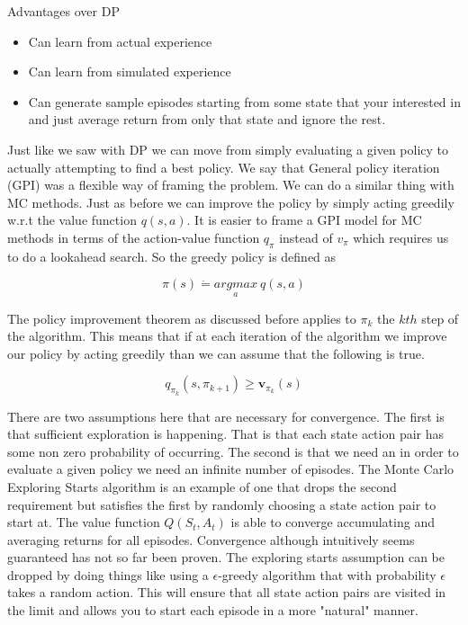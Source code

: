 Advantages over DP

\begin{itemize}
    \item Can learn from actual experience
    \item Can learn from simulated experience
    \item Can generate sample episodes starting from some state that your interested in and just average return from only that state and ignore the rest. 
\end{itemize}
 
Just like we saw with DP we can move from simply evaluating a given policy to actually attempting to find a best policy. We say that General policy iteration (GPI) was a flexible way of framing the problem. We can do a similar thing with MC methods. Just as before we can improve the policy by simply acting greedily w.r.t the value function $q(s,a)$. It is easier to frame a GPI model for MC methods in terms of the action-value function $q_{\pi}$ instead of $v_{\pi}$ which requires us to do a lookahead search.  So the greedy policy is defined as 


\begin{equation}\label{MC Greedy}
\pi(s) \dot{=}\underset{a}{argmax} \: q(s,a)
\end{equation}

The policy improvement theorem as discussed before applies to $\pi_{k}$ the $kth$ step of the algorithm. This means that if at each iteration of the algorithm we improve our policy by acting greedily than we can assume that the following is true. 

$$
q_{\pi_{k}}(s,\pi_{k + 1}) \geq \mathbf{v}_{\pi_{k}}(s)
$$

There are two assumptions here that are necessary for convergence. The first is that sufficient exploration is happening. That is that each state action pair has some non zero probability of occurring. The second is that we need an in order to evaluate a given policy we need an infinite number of episodes. The Monte Carlo Exploring Starts algorithm is an example of one that drops the second requirement but satisfies the first by randomly choosing a state action pair to start at. The value function $Q(S_{t},A_{t})$ is able to converge accumulating and averaging returns for all episodes. Convergence although intuitively seems guaranteed has not so far been proven. The exploring starts assumption can be dropped by doing things like using a $\epsilon$-greedy algorithm that with probability $\epsilon$ takes a random action. This will ensure that all state action pairs are visited in the limit and allows you to start each episode in a more "natural" manner.


